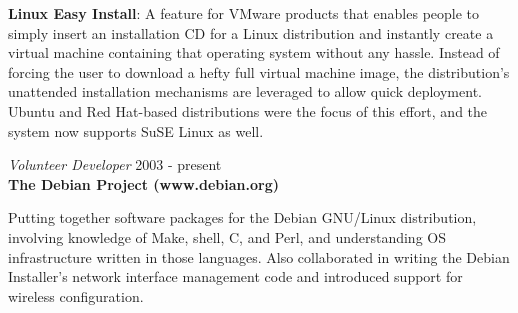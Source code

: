 \documentclass[overlapped,line,margin]{res}
\begin{document}
\begin{resume}
  \textbf{Linux Easy Install}: A feature for VMware products that enables people
  to simply insert an installation CD for a Linux distribution and instantly
  create a virtual machine containing that operating system without any hassle.
  Instead of forcing the user to download a hefty full virtual machine image,
  the distribution's unattended installation mechanisms are leveraged to allow
  quick deployment. Ubuntu and Red Hat-based distributions were the focus of
  this effort, and the system now supports SuSE Linux as well.

{\sl Volunteer Developer} \hfill 2003 - present \\
\textbf{The Debian Project (www.debian.org)}

  Putting together software packages for the Debian GNU/Linux distribution,
  involving knowledge of Make, shell, C, and Perl, and understanding OS
  infrastructure written in those languages. Also collaborated in writing the
  Debian Installer's network interface management code and introduced support
  for wireless configuration.

\end{resume}
\end{document}
